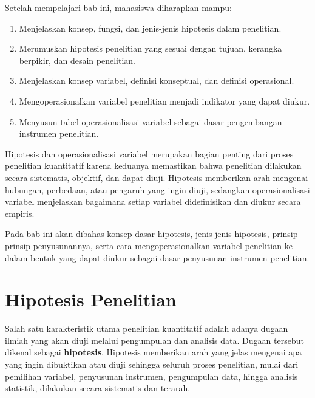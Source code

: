 \documentclass[
  indonesian,
  letterpaper,
  DIV=11,
  numbers=noendperiod]{scrreprt}
\providecommand{\tightlist}{%
  \setlength{\itemsep}{0pt}\setlength{\parskip}{0pt}}
\begin{document}
\begin{tcolorbox}[enhanced jigsaw, colframe=quarto-callout-note-color-frame, toptitle=1mm, breakable, leftrule=.75mm, arc=.35mm, toprule=.15mm, colback=white, colbacktitle=quarto-callout-note-color!10!white, bottomtitle=1mm, bottomrule=.15mm, titlerule=0mm, title=\textcolor{quarto-callout-note-color}{\faInfo}\hspace{0.5em}{Capaian Pembelajaran}, coltitle=black, left=2mm, opacitybacktitle=0.6, opacityback=0, rightrule=.15mm]

Setelah mempelajari bab ini, mahasiswa diharapkan mampu:

\begin{enumerate}
\def\labelenumi{\arabic{enumi}.}
\tightlist
\item
  Menjelaskan konsep, fungsi, dan jenis-jenis hipotesis dalam
  penelitian.
\item
  Merumuskan hipotesis penelitian yang sesuai dengan tujuan, kerangka
  berpikir, dan desain penelitian.
\item
  Menjelaskan konsep variabel, definisi konseptual, dan definisi
  operasional.
\item
  Mengoperasionalkan variabel penelitian menjadi indikator yang dapat
  diukur.
\item
  Menyusun tabel operasionalisasi variabel sebagai dasar pengembangan
  instrumen penelitian.
\end{enumerate}

\end{tcolorbox}

Hipotesis dan operasionalisasi variabel merupakan bagian penting dari
proses penelitian kuantitatif karena keduanya memastikan bahwa
penelitian dilakukan secara sistematis, objektif, dan dapat diuji.
Hipotesis memberikan arah mengenai hubungan, perbedaan, atau pengaruh
yang ingin diuji, sedangkan operasionalisasi variabel menjelaskan
bagaimana setiap variabel didefinisikan dan diukur secara empiris.

Pada bab ini akan dibahas konsep dasar hipotesis, jenis-jenis hipotesis,
prinsip-prinsip penyusunannya, serta cara mengoperasionalkan variabel
penelitian ke dalam bentuk yang dapat diukur sebagai dasar penyusunan
instrumen penelitian.

\section{Hipotesis Penelitian}\label{hipotesis-penelitian}

Salah satu karakteristik utama penelitian kuantitatif adalah adanya
dugaan ilmiah yang akan diuji melalui pengumpulan dan analisis data.
Dugaan tersebut dikenal sebagai \textbf{hipotesis}. Hipotesis memberikan
arah yang jelas mengenai apa yang ingin dibuktikan atau diuji sehingga
seluruh proses penelitian, mulai dari pemilihan variabel, penyusunan
instrumen, pengumpulan data, hingga analisis statistik, dilakukan secara
sistematis dan terarah.
\end{document}
